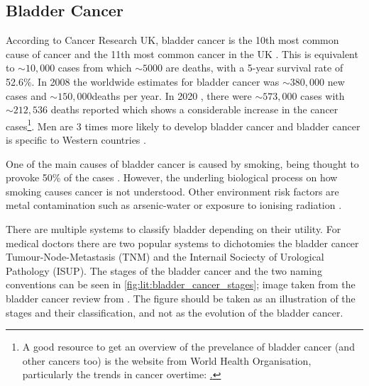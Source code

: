 \subsection{Bladder Cancer} \label{s:lit:bladder_cancer}
According to Cancer Research UK, bladder cancer is the 10th most common cause of cancer and the 11th most common cancer in the UK \cite{Cancer_Research_UK2015-cf}. This is equivalent to $\sim10,000$ cases from which  $\sim5000$ are deaths, with a 5-year survival rate of 52.6\%. In 2008\cite{Ferlay2010-sx} the worldwide estimates for bladder cancer was $\sim380,000$ new cases and $\sim150,000 $deaths per year. In 2020\cite{Sung2021-hn} , there were $\sim573,000$ cases with $\sim212,536$ deaths reported which shows a considerable increase in the cancer cases\footnote{A good resource to get an overview of the prevelance of bladder cancer (and other cancers too) is the website from World Health Organisation, particularly the trends in cancer overtime: \href{https://gco.iarc.fr/en}.}. Men are 3 times more likely to develop bladder cancer and bladder cancer is specific to Western countries \cite{Knowles2015-mu}. 

One of the main causes of bladder cancer is caused by smoking, being thought to provoke 50\% of the cases \citet{Knowles2015-mu}. However, the underling biological process on how smoking causes cancer is not understood. Other environment risk factors are metal contamination such as arsenic-water or exposure to ionising radiation \citet{Knowles2015-mu}. 

There are multiple systems to classify bladder depending on their utility. For medical doctors there are two popular systems to dichotomies the bladder cancer Tumour-Node-Metastasis (TNM) and the Internail Sociecty of Urological Pathology (ISUP). The stages of the bladder cancer and the two naming conventions can be seen in \cref{fig:lit:bladder_cancer_stages}; image taken from the bladder cancer review from \citet{Knowles2015-mu}. The figure should be taken as an illustration of the stages and their classification, and not as the evolution of the bladder cancer.

